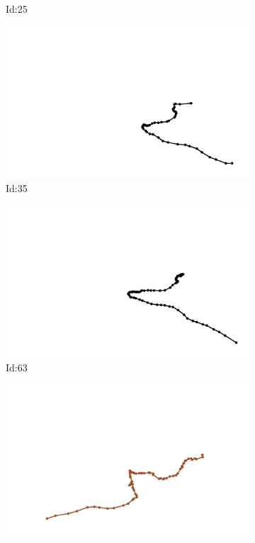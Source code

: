 \documentclass[12pt,twoside]{report}
\begin{document}
\begin{figure}
\begin{subfigure}[b]{0.20\textwidth}
\caption{Id:25}
\end{subfigure}
\begin{subfigure}[b]{0.20\textwidth}
\centering
\includegraphics[width=\textwidth]{../trajectories/35.png}
\caption{Id:35}
\end{subfigure}
\begin{subfigure}[b]{0.20\textwidth}
\centering
\includegraphics[width=\textwidth]{../trajectories/63.png}
\caption{Id:63}
\end{subfigure}
\begin{subfigure}[b]{0.20\textwidth}
\centering
\includegraphics[width=\textwidth]{../trajectories/79.png}

\end{subfigure}
\end{figure}
\end{document}
